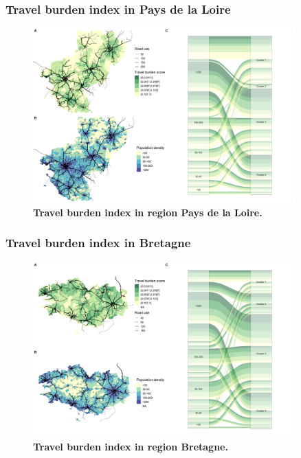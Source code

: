 \subsubsection{Travel burden index in Pays de la Loire}

\begin{figure}[H]
    \includegraphics[width=0.9\textwidth]{images/routes/fig4_52.png}
    \centering
    \caption{
        \textbf{Travel burden index in region Pays de la Loire.}
    }
    \label{fig:routes-burden-index-pdl}
\end{figure}

\subsubsection{Travel burden index in Bretagne}

\begin{figure}[H]
    \includegraphics[width=0.9\textwidth]{images/routes/fig4_53.png}
    \centering
    \caption{
        \textbf{Travel burden index in region Bretagne.}
    }
    \label{fig:routes-burden-index-bretagne}
\end{figure}

